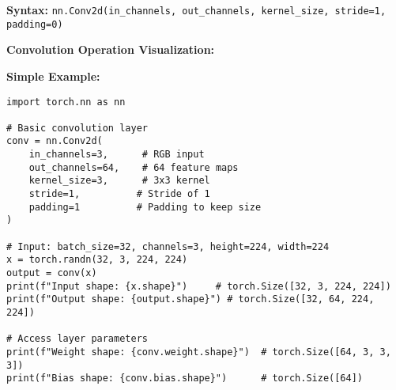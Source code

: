 \documentclass[11pt,a4paper]{book}
\begin{document}
\textbf{Syntax:} \texttt{nn.Conv2d(in\_channels, out\_channels, kernel\_size, stride=1, padding=0)}

\textbf{Convolution Operation Visualization:}

\begin{center}
\end{center}

\textbf{Simple Example:}
\begin{verbatim}
import torch.nn as nn

# Basic convolution layer
conv = nn.Conv2d(
    in_channels=3,      # RGB input
    out_channels=64,    # 64 feature maps
    kernel_size=3,      # 3x3 kernel
    stride=1,          # Stride of 1
    padding=1          # Padding to keep size
)

# Input: batch_size=32, channels=3, height=224, width=224
x = torch.randn(32, 3, 224, 224)
output = conv(x)
print(f"Input shape: {x.shape}")     # torch.Size([32, 3, 224, 224])
print(f"Output shape: {output.shape}") # torch.Size([32, 64, 224, 224])

# Access layer parameters
print(f"Weight shape: {conv.weight.shape}")  # torch.Size([64, 3, 3, 3])
print(f"Bias shape: {conv.bias.shape}")      # torch.Size([64])
\end{verbatim}
\end{document}
